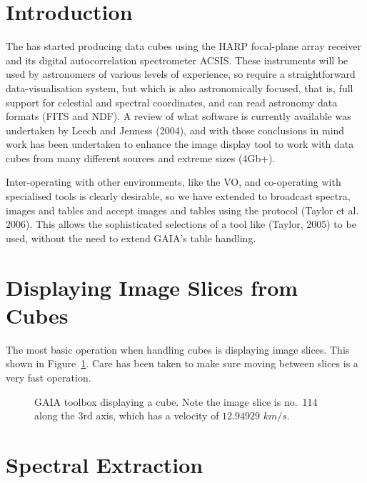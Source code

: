 \documentclass[11pt,twoside]{article}  %
\begin{document}
\section{Introduction}

The  has started
producing data cubes using the HARP focal-plane array receiver and its digital
autocorrelation spectrometer ACSIS. These instruments will be used by
astronomers of various levels of experience, so require a straight\-forward
data-visualisation system, but which is also astronomically focused,
that is, full support for celestial and spectral coordinates, and can read
astronomy data formats (FITS and NDF). A review of what software is currently
available was undertaken by Leech and Jenness (2004), and with those
conclusions in mind work has been undertaken to enhance the 
image display tool to work with data cubes from many different sources and
extreme sizes (4Gb+).

Inter-operating with other environments, like the VO, and co-operating with
specialised tools is clearly desirable, so we have extended 
to broadcast spectra, images and tables and accept images and tables using the
protocol (Taylor et al. 2006). This allows the sophisticated selections of a
tool like
(Taylor, 2005) to be used, without the need to extend GAIA's
table handling.

\section{Displaying Image Slices from Cubes}

The most basic operation when handling cubes is displaying image slices. This
shown in Figure~\ref{D1.1-fig1}. Care has been taken to make sure moving
between slices is a very fast operation.

\begin{figure}
\caption{GAIA toolbox displaying a cube. Note the image slice is no.\ 114
along the 3rd axis, which has a velocity of $12.94929$ $km/s$.
}
\label{D1.1-fig1}
\end{figure}

\section{Spectral Extraction}
\end{document}
